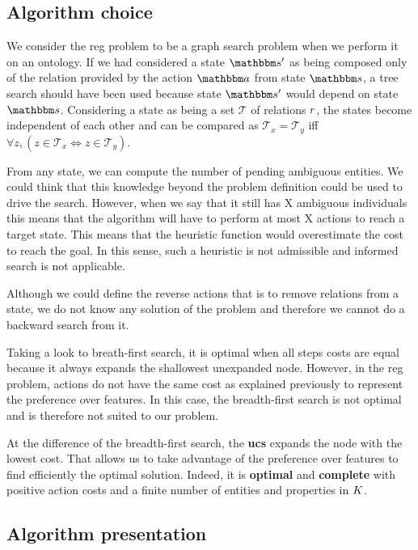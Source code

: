 \subsection{Algorithm choice}

We consider the \acrshort{reg} problem to be a graph search problem when we perform it on an ontology. If we had considered a state $\state'$ as being composed only of the relation provided by the action $\action$ from state $\state$, a tree search should have been used because state $\state'$ would depend on state $\state$. Considering a state as being a set $\mathcal{T}$ of relations $r$, the states become independent of each other and can be compared as $\mathcal{T}_x = \mathcal{T}_y$ iff $\forall{z},(z\in \mathcal{T}_x \Leftrightarrow z\in \mathcal{T}_y)$.

From any state, we can compute the number of pending ambiguous entities. We could think that this knowledge beyond the problem definition could be used to drive the search. However, when we say that it still has X ambiguous individuals this means that the algorithm will have to perform at most X actions to reach a target state. This means that the heuristic function would overestimate the cost to reach the goal. In this sense, such a heuristic is not admissible and informed search is not applicable.

Although we could define the reverse actions that is to remove relations from a state, we do not know any solution of the problem and therefore we cannot do a backward search from it.

Taking a look to breath-first search, it is optimal when all steps costs are equal because it always expands the shallowest unexpanded node. However, in the \acrshort{reg} problem, actions do not have the same cost as explained previously to represent the preference over features. In this case, the breadth-first search is not optimal and is therefore not suited to our problem.

At the difference of the breadth-first search, the \textbf{\acrfull{ucs}} expands the node with the lowest cost. That allows us to take advantage of the preference over features to find efficiently the optimal solution. Indeed, it is \textbf{optimal} and \textbf{complete} with positive action costs and a finite number of entities and properties in $K$.

\subsection{Algorithm presentation}

